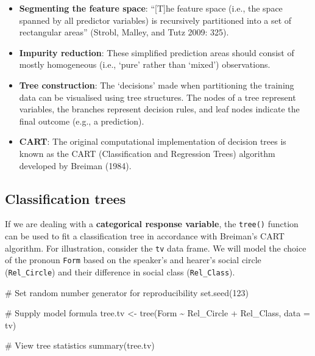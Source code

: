 \documentclass[
  11pt,
  letterpaper,
  DIV=11,
  numbers=noendperiod]{scrreprt}
\newenvironment{Shaded}{\begin{snugshade}}{\end{snugshade}}
\newcommand{\AttributeTok}[1]{\textcolor[rgb]{0.40,0.45,0.13}{#1}}
\newcommand{\CommentTok}[1]{\textcolor[rgb]{0.37,0.37,0.37}{#1}}
\newcommand{\DecValTok}[1]{\textcolor[rgb]{0.68,0.00,0.00}{#1}}
\newcommand{\FunctionTok}[1]{\textcolor[rgb]{0.28,0.35,0.67}{#1}}
\newcommand{\NormalTok}[1]{\textcolor[rgb]{0.00,0.23,0.31}{#1}}
\newcommand{\OtherTok}[1]{\textcolor[rgb]{0.00,0.23,0.31}{#1}}
\newcommand{\SpecialCharTok}[1]{\textcolor[rgb]{0.37,0.37,0.37}{#1}}
\begin{document}
\begin{itemize}
\item
  \textbf{Segmenting the feature space}: ``{[}T{]}he feature space
  (i.e., the space spanned by all predictor variables) is recursively
  partitioned into a set of rectangular areas'' (Strobl, Malley, and
  Tutz 2009: 325).
\item
  \textbf{Impurity reduction}: These simplified prediction areas should
  consist of mostly homogeneous (i.e., `pure' rather than `mixed')
  observations.
\item
  \textbf{Tree construction}: The `decisions' made when partitioning the
  training data can be visualised using tree structures. The nodes of a
  tree represent variables, the branches represent decision rules, and
  leaf nodes indicate the final outcome (e.g., a prediction).
\item
  \textbf{CART}: The original computational implementation of decision
  trees is known as the CART (Classification and Regression Trees)
  algorithm developed by Breiman (1984).
\end{itemize}

\subsection{Classification trees}\label{classification-trees}

If we are dealing with a \textbf{categorical response variable}, the
\texttt{tree()} function can be used to fit a classification tree in
accordance with Breiman's CART algorithm. For illustration, consider the
\texttt{tv} data frame. We will model the choice of the pronoun
\texttt{Form} based on the speaker's and hearer's social circle
(\texttt{Rel\_Circle}) and their difference in social class
(\texttt{Rel\_Class}).

\begin{Shaded}
\begin{Highlighting}[]
\CommentTok{\# Set random number generator for reproducibility}
\FunctionTok{set.seed}\NormalTok{(}\DecValTok{123}\NormalTok{)}

\CommentTok{\# Supply model formula}
\NormalTok{tree.tv }\OtherTok{\textless{}{-}} \FunctionTok{tree}\NormalTok{(Form }\SpecialCharTok{\textasciitilde{}}\NormalTok{ Rel\_Circle }\SpecialCharTok{+}\NormalTok{ Rel\_Class, }\AttributeTok{data =}\NormalTok{ tv)}

\CommentTok{\# View tree statistics}
\FunctionTok{summary}\NormalTok{(tree.tv)}
\end{Highlighting}
\end{Shaded}
\end{document}
